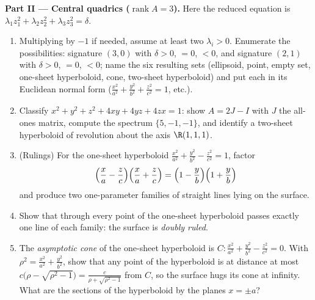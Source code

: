 \begin{problem}
\medskip
\noindent\textbf{Part II --- Central quadrics
($\operatorname{rank}A = 3$).} Here the reduced equation is
$\lambda_1z_1^2 + \lambda_2z_2^2 + \lambda_3z_3^2 = \delta$.
\begin{enumerate}[resume]
  \item Multiplying by $-1$ if needed, assume at least two
        $\lambda_i > 0$. Enumerate the possibilities:
        signature $(3, 0)$ with $\delta > 0$, $= 0$, $< 0$,
        and signature $(2, 1)$ with $\delta > 0$, $= 0$, $<
        0$; name the six resulting sets (ellipsoid, point,
        empty set, one-sheet hyperboloid, cone, two-sheet
        hyperboloid) and put each in its Euclidean normal
        form ($\frac{x^2}{a^2} + \frac{y^2}{b^2} +
        \frac{z^2}{c^2} = 1$, etc.).
  \item Classify $x^2 + y^2 + z^2 + 4xy + 4yz + 4zx = 1$:
        show $A = 2J - I$ with $J$ the all-ones matrix,
        compute the spectrum $\{5, -1, -1\}$, and identify a
        two-sheet hyperboloid of revolution about the axis
        $\R(1,1,1)$.
  \item (Rulings) For the one-sheet hyperboloid
        $\frac{x^2}{a^2} + \frac{y^2}{b^2} - \frac{z^2}{c^2}
        = 1$, factor
        \[
        \Bigl(\frac xa - \frac zc\Bigr)
        \Bigl(\frac xa + \frac zc\Bigr)
        = \Bigl(1 - \frac yb\Bigr)\Bigl(1 + \frac yb\Bigr)
        \]
        and produce two one-parameter families of straight
        lines lying on the surface.
  \item Show that through every point of the one-sheet
        hyperboloid passes exactly one line of each family:
        the surface is \emph{doubly ruled}.
  \item The \emph{asymptotic cone} of the one-sheet
        hyperboloid is $C : \frac{x^2}{a^2} + \frac{y^2}{b^2}
        - \frac{z^2}{c^2} = 0$. With $\rho^2 = \frac{x^2}{a^2}
        + \frac{y^2}{b^2}$, show that any point of the
        hyperboloid is at distance at most $c\bigl(\rho -
        \sqrt{\rho^2 - 1}\bigr) = \frac{c}{\rho +
        \sqrt{\rho^2 - 1}}$ from $C$, so the surface hugs its
        cone at infinity. What are the sections of the
        hyperboloid by the planes $x = \pm a$?
\end{enumerate}


\end{problem}
